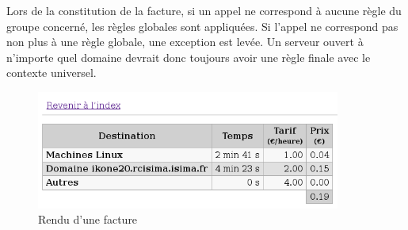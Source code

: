 Lors de la constitution de la facture, si un appel ne correspond à aucune règle du groupe concerné, les règles globales sont appliquées. Si l’appel ne correspond pas non plus à une règle globale, une exception est levée. Un serveur ouvert à n’importe quel domaine devrait donc toujours avoir une règle finale avec le contexte universel. 

\begin{figure}
\begin{center}
\includegraphics[width=10cm]{images/facture.png}
\end{center}
\label{imgfacture}
\caption{Rendu d’une facture}
\end{figure}


